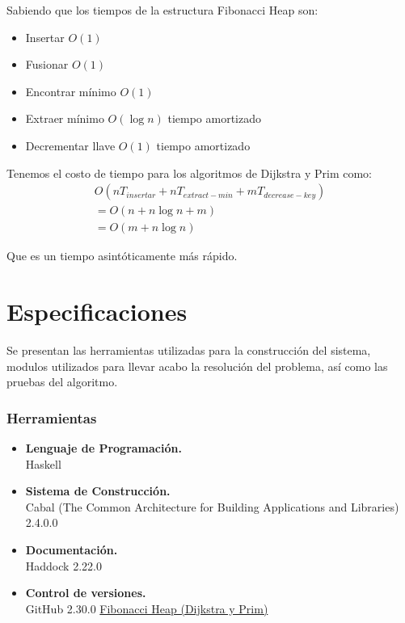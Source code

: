 \documentclass[a4paper, titlepage, 12pt]{article}
\theoremstyle{definition}%
\theoremstyle{Teorema}
\theoremstyle{break}
\begin{document}
Sabiendo que los tiempos de la estructura Fibonacci Heap son:
\begin{itemize}
  \item Insertar $O(1)$
  \item Fusionar $O(1)$
  \item Encontrar mínimo $O(1)$
  \item Extraer mínimo $O(\log n)$ tiempo amortizado
  \item Decrementar llave $O(1)$ tiempo amortizado
\end{itemize}

Tenemos el costo de tiempo para los algoritmos de Dijkstra y Prim como:
\begin{align*}
  O(nT_{insertar}+nT_{extract-min}+mT_{decrease-key})\\
  = O(n + n\log n + m)\\
  = O(m + n\log n)
\end{align*}

Que es un tiempo asintóticamente más rápido.

\section{Especificaciones}
Se presentan las herramientas utilizadas para la construcción del sistema,
modulos utilizados para llevar acabo la resolución del problema, así como las pruebas del 
algoritmo.
\subsubsection{Herramientas}
\begin{itemize}
  \item \textbf{Lenguaje de Programación.}\\
  Haskell
  \item \textbf{Sistema de Construcción.}\\
  Cabal (The Common Architecture for Building Applications and Libraries) 2.4.0.0
  \item \textbf{Documentación.}\\
  Haddock 2.22.0
  \item \textbf{Control de versiones.}\\
  GitHub 2.30.0 \href{https://github.com/ciencias-unam/proyecto-final-kevRicardo}{Fibonacci Heap (Dijkstra y Prim)}
\end{itemize}
\end{document}
